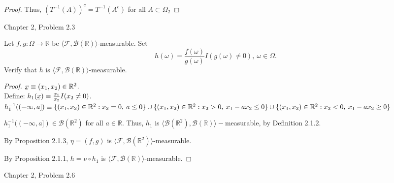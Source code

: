 \documentclass[12pt,letterpaper, onecolumn]{exam}
\newcommand{\ubar}[1]{\underaccent{\bar}{#1}}
\newcommand{\real}{\mathbb{R}}
\newcommand{\calF}{\mathcal{F}}
\newcommand{\tribrac}[1]{\langle #1 \rangle}
\newcommand{\borel}{\mathcal{B}(\mathbb{R})}
\newcommand{\borelk}[1]{\mathcal{B}(\mathbb{R}^#1)}
\begin{document}
\begin{questions}
\begin{solution}
\begin{proof}
        Thus, $(T^{-1}(A))^c = T^{-1}(A^c)$ for all $A \subset \Omega_2$
    \end{proof}
    \end{solution}

    \question Chapter 2, Problem 2.3

    Let $f, g: \Omega \to \real$ be $\tribrac{\calF, \borel}$-measurable. Set
    \[h(\omega) = \frac{f(\omega)}{g(\omega)}I(g(\omega) \neq 0), \: \omega \in \Omega.\]
    Verify that $h$ is $\tribrac{\calF, \borel}$-measurable. 
    \begin{solution}
    \begin{proof}
        $\ubar{x} \equiv (x_1, x_2) \in \real^2$. \\
        Define: $h_1(\ubar{x}) \equiv \frac{x_1}{x_2}I(x_2 \neq 0)$. \\
        $h_{1}^{-1}((-\infty, a]) \equiv \{(x_1, x_2) \in \real^2: x_2 = 0, \: a \leq 0\} \\ \cup \{(x_1, x_2) \in \real^2: x_2 > 0, \: x_1 - a x_2  \leq 0\} \cup \{(x_1, x_2) \in \real^2: x_2 < 0, \: x_1 - a x_2 \geq 0\}$
        
        $h_{1}^{-1}((-\infty, a]) \in \borelk{2}$ for all $a \in \real$. Thus, $h_1$ is $\tribrac{\borelk{2}, \borel}-$measurable, by Definition 2.1.2.

        By Proposition 2.1.3, $\eta = (f, g)$ is $\tribrac{\calF, \borelk{2}}$-measurable.

        By Proposition 2.1.1, $h = \nu \circ h_1$ is $\tribrac{\calF, \borel}$-measurable.
    \end{proof}
    \end{solution}

    \question Chapter 2, Problem 2.6


\end{questions}
\end{document}
